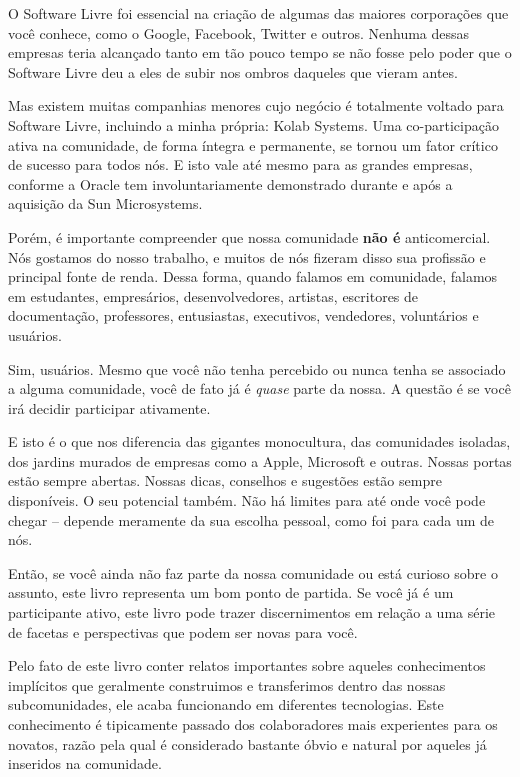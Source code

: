 O Software Livre foi essencial na criação de algumas das maiores
corporações que você conhece, como o Google, Facebook, Twitter e outros.
Nenhuma dessas empresas teria alcançado tanto em tão pouco tempo se não
fosse pelo poder que o Software Livre deu a eles de subir nos ombros daqueles
que vieram antes.

Mas existem muitas companhias menores cujo negócio é totalmente
voltado para Software Livre, incluindo a minha própria: Kolab Systems.
Uma co-participação ativa na comunidade, de forma íntegra e permanente,
se tornou um fator crítico de sucesso para todos nós. E isto vale até
mesmo para as grandes empresas, conforme a Oracle tem involuntariamente
demonstrado durante e após a aquisição da Sun Microsystems.

Porém, é importante compreender que nossa comunidade \textbf{não é}
anticomercial. Nós gostamos do nosso trabalho, e muitos de nós fizeram
disso sua profissão e principal fonte de renda. Dessa forma, quando
falamos em comunidade, falamos em estudantes, empresários, desenvolvedores,
artistas, escritores de documentação, professores, entusiastas, executivos,
vendedores, voluntários e usuários.

Sim, usuários. Mesmo que você não tenha percebido ou nunca tenha se
associado a alguma comunidade, você de fato já é \emph{quase} parte
da nossa. A questão é se você irá decidir participar ativamente.

E isto é o que nos diferencia das gigantes monocultura, das comunidades
isoladas, dos jardins murados de empresas como a Apple, Microsoft e
outras. Nossas portas estão sempre abertas. Nossas dicas, conselhos
e sugestões estão sempre disponíveis. O seu potencial também. Não há
limites para até onde você pode chegar -- depende meramente da sua
escolha pessoal, como foi para cada um de nós.

Então, se você ainda não faz parte da nossa comunidade ou está curioso
sobre o assunto, este livro representa um bom ponto de partida. Se
você já é um participante ativo, este livro pode trazer discernimentos
em relação a uma série de facetas e perspectivas que podem ser novas
para você.

Pelo fato de este livro conter relatos importantes sobre aqueles
conhecimentos implícitos que geralmente construimos e transferimos
dentro das nossas subcomunidades, ele acaba funcionando em diferentes
tecnologias. Este conhecimento é tipicamente passado dos colaboradores
mais experientes para os novatos, razão pela qual é considerado bastante
óbvio e natural por aqueles já inseridos na comunidade.

